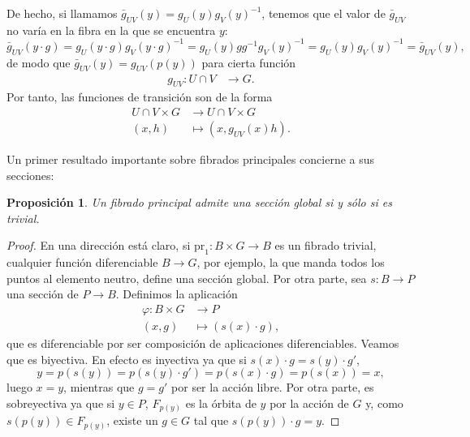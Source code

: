 \documentclass[12pt,a4paper]{article}
\newtheorem{prop}[thm]{Proposición}
\theoremstyle{definition} \newtheorem{defn}[thm]{Definición}
\theoremstyle{definition} \newtheorem{ejemplo}[thm]{Ejemplo}
\theoremstyle{definition} \newtheorem{ejercicio}[thm]{Ejercicio}
\theoremstyle{remark} \newtheorem*{obs}{Observación}
\def\pr{\mathrm{pr}}
\begin{document}
	      De hecho, si llamamos $\bar{g}_{UV}(y)=g_{U}(y)g_V(y)^{-1}$, tenemos que el valor de $\bar{g}_{UV}$ no varía en la fibra en la que se encuentra $y$:
	      \begin{equation*}
		\bar{g}_{UV}(y\cdot g)=g_{U}(y\cdot g)g_V(y\cdot g)^{-1}=g_{U}(y)g g^{-1}g_V(y)^{-1}=g_{U}(y)g_V(y)^{-1}=\bar{g}_{UV}(y),
	      \end{equation*}
	      de modo que $\bar{g}_{UV}(y)=g_{UV}(p(y))$ para cierta función
	      \begin{align*}
		g_{UV} :U\cap V&\longrightarrow G.
		\end{align*}
		Por tanto, las funciones de transición son de la forma
		\begin{align*}
		   U\cap V \times G&\longrightarrow U\cap V \times G\\ 
		   (x,h) &\longmapsto (x,g_{UV}(x)h). 
		  \end{align*}

		  Un primer resultado importante sobre fibrados principales concierne a sus secciones:
		  \begin{prop}
		    Un fibrado principal admite una sección global si y sólo si es trivial.
		  \end{prop}
		  \begin{proof}
		    En una dirección está claro, si $\pr_1:B\times G\rightarrow B$ es un fibrado trivial, cualquier función diferenciable $B\rightarrow G$, por ejemplo, la que manda todos los puntos al elemento neutro, define una sección global.
		    Por otra parte, sea $s:B\rightarrow P$ una sección de $P\rightarrow B$. Definimos la aplicación
		    \begin{align*}
		      \varphi: B\times G&\longrightarrow P\\ 
		        (x,g) &\longmapsto (s(x)\cdot g),
		      \end{align*}
		      que es diferenciable por ser composición de aplicaciones diferenciables. Veamos que es biyectiva. En efecto es inyectiva ya que si $s(x)\cdot g=s(y)\cdot g'$, $$y=p(s(y))=p(s(y)\cdot g')=p(s(x) \cdot g)=p(s(x))=x,$$ luego $x=y$, mientras que $g=g'$ por ser la acción libre. Por otra parte, es sobreyectiva ya que si $y\in P$, $F_{p(y)}$ es la órbita de $y$ por la acción de $G$ y, como $s(p(y))\in F_{p(y)}$, existe un $g\in G$ tal que $s(p(y))\cdot g=y$. 
		  \end{proof}
\end{document}
